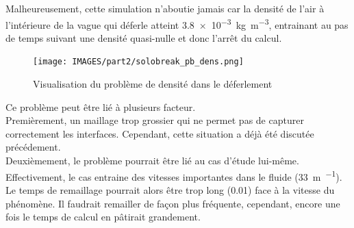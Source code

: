 \documentclass[../main.tex]{subfiles}
\begin{document}
Malheureusement, cette simulation n'aboutie jamais car la densité de l'air à l'intérieure de la vague qui déferle atteint \qty{3.8e-3}{\kilogram\per\cubic\meter}, entrainant au pas de temps suivant une densité quasi-nulle et donc l'arrêt du calcul.\\

\begin{figure}[H]
    \centering
    \texttt{[image: IMAGES/part2/solobreak\_pb\_dens.png]}
    \caption{Visualisation du problème de densité dans le déferlement}
\end{figure}

Ce problème peut être lié à plusieurs facteur.\\
Premièrement, un maillage trop grossier qui ne permet pas de capturer correctement les interfaces. Cependant, cette situation a déjà été discutée précédement.\\
Deuxièmement, le problème pourrait être lié au cas d'étude lui-même. Effectivement, le cas entraine des vitesses importantes dans le fluide (\qty{33}{\meter\per\sec}). Le temps de remaillage pourrait alors être trop long (\qty{0.01}{\sec}) face à la vitesse du phénomène. Il faudrait remailler de façon plus fréquente, cependant, encore une fois le temps de calcul en pâtirait grandement.
\end{document}
